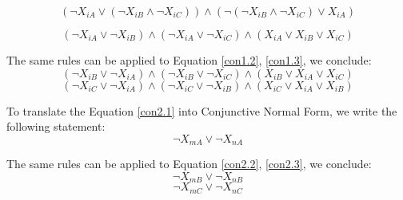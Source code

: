 \documentclass[12pt, a4paper]{report}
\begin{document}
\begin{equation}
    (\neg X_{iA} \vee (\neg X_{iB} \wedge \neg X_{iC})) \wedge (\neg (\neg X_{iB} \wedge \neg X_{iC}) \vee X_{iA})
\end{equation}

\begin{equation}
    (\neg X_{iA} \vee \neg X_{iB}) \wedge (\neg X_{iA} \vee \neg X_{iC}) \wedge (X_{iA} \vee X_{iB} \vee X_{iC})
\end{equation}

The same rules can be applied to Equation \ref{con1.2}, \ref{con1.3}, we conclude:
\begin{equation}
    (\neg X_{iB} \vee \neg X_{iA}) \wedge (\neg X_{iB} \vee \neg X_{iC}) \wedge (X_{iB} \vee X_{iA} \vee X_{iC})
\end{equation}
\begin{equation}
    (\neg X_{iC} \vee \neg X_{iA}) \wedge (\neg X_{iC} \vee \neg X_{iB}) \wedge (X_{iC} \vee X_{iA} \vee X_{iB})
\end{equation}

To translate the Equation \ref{con2.1} into Conjunctive Normal Form, we write the following statement:
\begin{equation}
    \neg X_{mA} \vee \neg X_{nA}
\end{equation}

The same rules can be applied to Equation \ref{con2.2}, \ref{con2.3}, we conclude:
\begin{equation}
    \neg X_{mB} \vee \neg X_{nB}
\end{equation}
\begin{equation}
    \neg X_{mC} \vee \neg X_{nC}
\end{equation}
\end{document}
